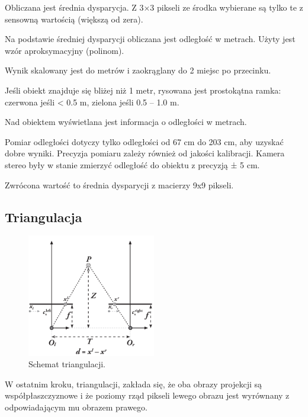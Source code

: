 \documentclass[magisterska]{pracadypl}
\begin{document}
Obliczana jest średnia dysparycja. Z 3×3 pikseli ze środka wybierane są tylko te z sensowną wartością (większą od zera).

Na podstawie średniej dysparycji obliczana jest odległość w metrach. Użyty jest wzór aproksymacyjny (polinom).

Wynik skalowany jest do metrów i zaokrąglany do 2 miejsc po przecinku.

Jeśli obiekt znajduje się bliżej niż 1 metr, rysowana jest prostokątna ramka: czerwona jeśli < 0.5 m, zielona jeśli 0.5 – 1.0 m.

Nad obiektem wyświetlana jest informacja o odległości w metrach.

Pomiar odległości dotyczy tylko odległości od 67 cm do 203 cm, aby uzyskać dobre wyniki. Precyzja pomiaru zależy również od jakości kalibracji. Kamera stereo były w stanie zmierzyć odległość do obiektu z precyzją ± 5 cm.

Zwrócona wartość to średnia dysparycji z macierzy 9x9 pikseli.

\subsection{Triangulacja}

\begin{figure}[H]  %
    \centering  %
    \includegraphics[width=0.5\textwidth]{images/triangulation.png}  %
    \captionsetup{font=footnotesize}
    \caption[Schemat triangulacji. Learning OpenCV 3, O'Reilly, Str. 705]{Schemat triangulacji.}
    \label{fig:rpi}  %
\end{figure}

W ostatnim kroku, triangulacji, zakłada się, że oba obrazy projekcji są współpłaszczyznowe i że poziomy rząd pikseli lewego obrazu jest wyrównany z odpowiadającym mu obrazem prawego.
\end{document}
